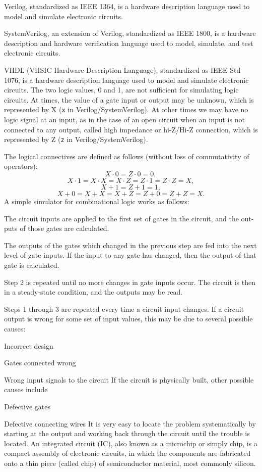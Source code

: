 \documentclass[a4paper,12pt]{report}
\begin{document}
Verilog, standardized as IEEE 1364, is a hardware description language used to model and simulate electronic circuits.

SystemVerilog, an extension of Verilog, standardized as IEEE 1800, is a hardware description and hardware verification language used to model, simulate, and test electronic circuits.

VHDL (VHSIC Hardware Description Language), standardized as IEEE Std 1076, is a hardware description language used to model and simulate electronic circuits.
The two logic values, 0 and 1, are not sufficient for simulating logic circuits. At times, the value of a gate input or output may be unknown, which is represented by X (\verb|x| in Verilog/SystemVerilog). At other times we may have no logic signal at an input, as in the case of an open circuit when an input is not connected to any output, called high impedance or hi-Z/Hi-Z connection, which is represented by Z (\verb|z| in Verilog/SystemVerilog).

The logical connectives are defined as follows (without loss of commutativity of operators):
\[X\cdot0=Z\cdot0=0,\]
\[X\cdot1=X\cdot X=X\cdot Z=Z\cdot1=Z\cdot Z=X,\]
\[X+1=Z+1=1,\]
\[X+0=X+X=X+Z=Z+0=Z+Z=X.\]
A simple simulator for combinational logic works as follows:
\ben
\item The circuit inputs are applied to the first set of gates in the circuit, and the out-puts of those gates are calculated.
\item The outputs of the gates which changed in the previous step are fed into the next level of gate inputs. If the input to any gate has changed, then the output of that gate is calculated.
\item Step 2 is repeated until no more changes in gate inputs occur. The circuit is then in a steady-state condition, and the outputs may be read.
\item Steps 1 through 3 are repeated every time a circuit input changes.
\een
If a circuit output is wrong for some set of input values, this may be due to several possible causes:
\bit
\item Incorrect design
\item Gates connected wrong
\item Wrong input signals to the circuit
\eit
If the circuit is physically built, other possible causes include
\bit
\item Defective gates
\item Defective connecting wires
\eit
It is very easy to locate the problem systematically by starting at the output and working back through the circuit until the trouble is located.
An integrated circuit (IC), also known as a microchip or simply chip, is a compact assembly of electronic circuits, in which the components are fabricated onto a thin piece (called chip) of semiconductor material, most commonly silicon.
\end{document}
